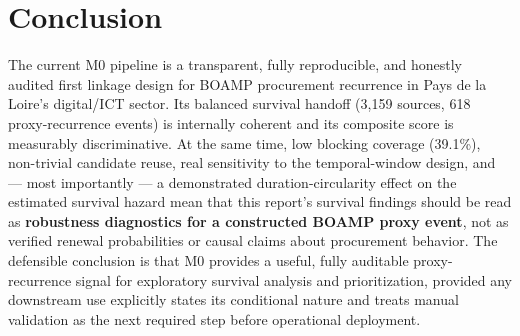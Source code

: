 \documentclass[11pt]{article}
\begin{document}
\section*{Conclusion}
The current M0 pipeline is a transparent, fully reproducible, and honestly
audited first linkage design for BOAMP procurement recurrence in Pays de la
Loire's digital/ICT sector. Its balanced survival handoff (3{,}159 sources,
618 proxy-recurrence events) is internally coherent and its composite score
is measurably discriminative. At the same time, low blocking coverage
(39.1\%), non-trivial candidate reuse, real sensitivity to the
temporal-window design, and --- most importantly --- a demonstrated
duration-circularity effect on the estimated survival hazard mean that this
report's survival findings should be read as \textbf{robustness diagnostics
for a constructed BOAMP proxy event}, not as verified renewal probabilities
or causal claims about procurement behavior. The defensible conclusion is
that M0 provides a useful, fully auditable proxy-recurrence signal for
exploratory survival analysis and prioritization, provided any downstream
use explicitly states its conditional nature and treats manual validation
as the next required step before operational deployment.
\end{document}
